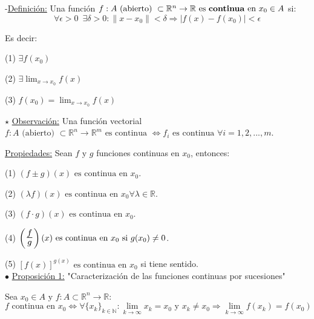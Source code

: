 \documentclass[12pt, titlepage]{article}
\newcommand{\R}{\mathbb{R}}
\newcommand{\N}{\mathbb{N}}
\newcommand{\bfrac}[2]{\scalebox{1.4}{$\frac{#1}{#2}$}}
\newcommand{\spac}{\, \, \,}
\newcommand{\definicion}{\noindent-\underline{Definición:} }
\newcommand{\proposicion}[1][\!\!]{\noindent$\bullet$ \underline{Proposición #1:} }
\newcommand{\observacion}{\noindent$\star$ \underline{Observación:} }
\begin{document}
\definicion Una función $f : A \text{ (abierto) } \subset \R^n \to \R \text{ es \textbf{continua} en } \\ x_0 \in 
A$ si:
\[
\boxed{
\forall{\epsilon > 0} \spac \exists{\delta > 0} : \|x - x_0\| < \delta \Rightarrow |f (x) - f (x_0)| 
< \epsilon
}
\]

Es decir:
\vspace{3mm}

(1) $\exists f (x_0)$
\vspace{3mm}

(2) $\exists \displaystyle \lim_{x \to x_0} f (x)$
\vspace{2mm}

(3) $f (x_0) = \displaystyle \lim_{x \to x_0} f (x)$
\vspace{5mm}

\observacion Una función vectorial $f : A \text{ (abierto) } \subset \R^n \to \R^m \text{ es continua } \iff 
f_i \text{ es continua } \forall{i = 1, 2,..., m}$.
\vspace{5mm}

\underline{Propiedades:} Sean $f \text{ y } g$ funciones continuas en $x_0$, entonces:
\vspace{3mm}

\indent \indent (1) $(f \pm g) (x) \text{ es continua en } x_0$.
\vspace{3mm}

\indent \indent (2) $(\lambda f) (x) \text{ es continua en } x_0 \forall{\lambda \in \R}$.
\vspace{3mm}

\indent \indent (3) $(f \cdot g) (x) \text{ es continua en } x_0$.
\vspace{3mm}

\indent \indent (4) $\left ( \bfrac{f}{g} \right ) (x) \text{ es continua en } x_0 \text{ si } g (x_0) \neq 0$.
\vspace{3mm}

\indent \indent (5) $[f (x)]^{g (x)} \text{ es continua en } x_0$ si tiene sentido.
\vspace{5mm}
\\


\proposicion[1] "Caracterización de las funciones continuas por sucesiones"

Sea $x_0 \in A \text{ y } f : A \subset \R^n \to \R$:
\[
\boxed{
f \text{ continua en } x_0 \iff \forall{\{x_k\}_{k \in \N}} : \displaystyle \lim_{k \to  \infty} x_k = x_0 \text{ y }
 x_k \neq x_0 \Rightarrow \lim_{k \to \infty} f (x_k) = f (x_0)
}
\]
\vspace{3mm}
\end{document}
